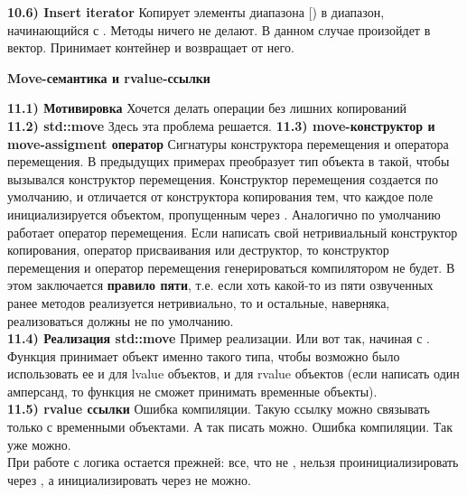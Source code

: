 \documentclass{article}
\begin{document}
\noindent \textbf{10.6) Insert iterator}
Копирует элементы диапазона [) в диапазон, начинающийся с . 
Методы  ничего не делают.
В данном случае произойдет  в вектор.
Принимает контейнер и возвращает  от него.
\begin{center}
	\begin{large}
		\textbf{Move-семантика и rvalue-ссылки}
	\end{large}
\end{center}
\noindent \textbf{11.1) Мотивировка}
Хочется делать операции  без лишних копирований\\
\noindent \textbf{11.2) std::move}
Здесь эта проблема решается.
\newpage
\noindent \textbf{11.3) move-конструктор и move-assigment оператор}
Сигнатуры конструктора перемещения и оператора перемещения.
В предыдущих примерах  преобразует тип объекта в такой, чтобы вызывался конструктор перемещения. Конструктор перемещения создается по умолчанию, и отличается от конструктора копирования тем, что каждое поле инициализируется объектом, пропущенным через . Аналогично по умолчанию работает оператор перемещения. Если написать свой нетривиальный конструктор копирования, оператор присваивания или деструктор, то конструктор перемещения и оператор перемещения генерироваться компилятором не будет. В этом заключается \textbf{правило пяти}, т.е. если хоть какой-то из пяти озвученных ранее методов реализуется нетривиально, то и остальные, наверняка, реализоваться должны не по умолчанию.\\
\noindent \textbf{11.4) Реализация std::move}
Пример реализации.
Или вот так, начиная с .\\
Функция принимает объект именно такого типа, чтобы возможно было использовать ее и для lvalue объектов, и для rvalue объектов (если написать один амперсанд, то функция не сможет принимать временные объекты).\\
\noindent \textbf{11.5) rvalue ссылки}
Ошибка компиляции. Такую ссылку можно связывать только с временными объектами.
А так писать можно.
Ошибка компиляции.
Так уже можно.\\
При работе с  логика остается прежней: все, что не , нельзя проинициализировать через , а инициализировать  через не  можно.\\\\\\\\
\end{document}
